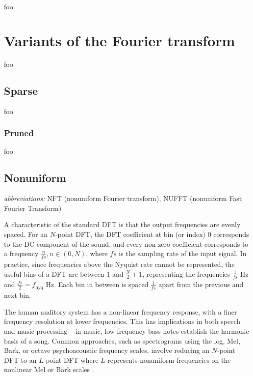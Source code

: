 \documentclass[letter,12pt]{article}
\begin{document}
foo

\section{Variants of the Fourier transform}
\label{sec:theory}

foo

\subsection{Sparse}

foo

\subsubsection{Pruned}

foo

\subsection{Nonuniform}

\qquad \textit{abbreviations:} NFT (nonuniform Fourier transform), NUFFT (nonuniform Fast Fourier Transform)

A characteristic of the standard DFT is that the output frequencies are evenly spaced. For an $N$-point DFT, the DFT coefficient at bin (or index) 0 corresponds to the DC component of the sound, and every non-zero coefficient corresponds to a frequency $\frac{n}{\mathit{fs}}, n \in (0, N)$, where $\mathit{fs}$ is the sampling rate of the input signal. In practice, since frequencies above the Nyquist rate cannot be represented, the useful bins of a DFT are between $1$ and $\frac{N}{2}+1$, representing the frequencies $\frac{1}{\mathit{fs}}$ Hz and $\frac{\mathit{fs}}{2} = f_{\text{nyq}}$ Hz. Each bin in between is spaced $\frac{1}{\mathit{fs}}$ apart from the previous and next bin.

The human auditory system has a non-linear frequency response, with a finer frequency resolution at lower frequencies.  This has implications in both speech and music processing -- in music, low frequency bass notes establish the harmonic basis of a song.  Common approaches, such as spectrograms using the log, Mel, Bark, or octave psychoacoustic frequency scales, involve reducing an $N$-point DFT to an $L$-point DFT where $L$ represents nonuniform frequencies on the nonlinear Mel or Bark scales .
\end{document}
